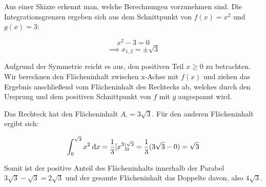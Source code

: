 \item Aus einer Skizze erkennt man, welche Berechnungen vorzunehmen sind. Die Integrationsgrenzen ergeben sich aus dem Schnittpunkt von $f(x)=x^2$ und $g(x)=3$:

$$x^2-3=0$$
$$\implies x_{1,2} = \pm \sqrt{3}$$

Aufgrund der Symmetrie reicht es aus, den positiven Teil $x \geq 0$ zu betrachten. Wir berechnen den Flächeninhalt zwischen x-Achse mit $f(x)$ und ziehen das Ergebnis anschließend vom Flächeninhalt des Rechtecks ab, welches durch den Ursprung und dem positiven Schnittpunkt von $f$ mit $g$ augespannt wird.

Das Rechteck hat den Flächeninhalt $A_\square = 3 \sqrt{3}$. Für den anderen Flächeninhalt ergibt sich:

$$\int_0^{\sqrt{3}} x^2 \:\mathrm{d}{x}= \frac{1}{3} \lbrack x^3 \rbrack_0^{\sqrt{3}} = \frac{1}{3} (3\sqrt{3}-0) = \sqrt{3}$$

Somit ist der positive Anteil des Flächeninhalts innerhalb der Parabel $3\sqrt{3}-\sqrt{3}=2\sqrt{3}$ und der gesamte Flächeninhalt das Doppelte davon, also $4\sqrt{3}$.

